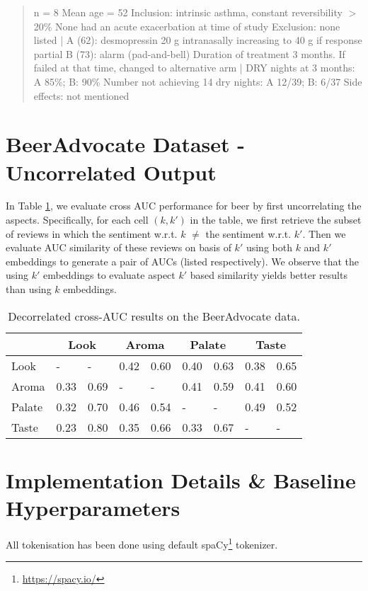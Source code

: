 \documentclass[11pt,a4paper]{article}
\begin{document}
{\footnotesize \begin{quote} n = 8 Mean age = 52 Inclusion: intrinsic asthma, constant reversibility $>$ 20\% None had an acute exacerbation at time of study Exclusion: none listed | A (62): desmopressin 20 g intranasally increasing to 40 g if response partial B (73): alarm (pad-and-bell) Duration of treatment 3 months. If failed at that time, changed to alternative arm | DRY nights at 3 months: A 85\%; B: 90\% Number not achieving 14 dry nights: A 12/39; B: 6/37 Side effects: not mentioned \end{quote}}

\section{BeerAdvocate Dataset - Uncorrelated Output}

In Table \ref{table:decorrelated}, we evaluate cross AUC performance for beer by first uncorrelating the aspects. Specifically, for each cell $(k, k')$ in the table, we first retrieve the subset of reviews in which the sentiment w.r.t. $k$ $\neq$ the sentiment w.r.t. $k'$. Then we evaluate AUC similarity of these reviews on basis of $k'$ using both $k$ and $k'$ embeddings to generate a pair of AUCs (listed respectively). We observe that the using $k'$ embeddings to evaluate aspect $k'$ based similarity yields better results than using $k$ embeddings.
\begin{table}[htbp]
\footnotesize
\centering
\begin{tabularx}{\columnwidth}{l|X X|X X|X X|X X}
 & \multicolumn{2}{c|}{Look}  & \multicolumn{2}{c|}{Aroma}  & \multicolumn{2}{c|}{Palate} & \multicolumn{2}{c}{Taste} \\ \hline
Look & - & - & 0.42 &	0.60 & 0.40	& 0.63	& 0.38	& 0.65 \\ \hline
Aroma & 0.33 & 0.69 & - & - & 0.41 & 0.59 & 0.41 & 0.60 \\ \hline
Palate & 0.32 & 0.70 & 0.46 & 0.54 & - & - & 0.49 & 0.52 \\ \hline
Taste & 0.23 & 0.80 & 0.35 & 0.66 & 0.33 & 0.67 & - & - \\
\end{tabularx}
\caption{Decorrelated cross-AUC results on the BeerAdvocate data.}
\label{table:decorrelated}
\end{table}

\section{Implementation Details \& Baseline Hyperparameters}
All tokenisation has been done using default spaCy\footnote{\url{https://spacy.io/}} tokenizer. %
\end{document}
